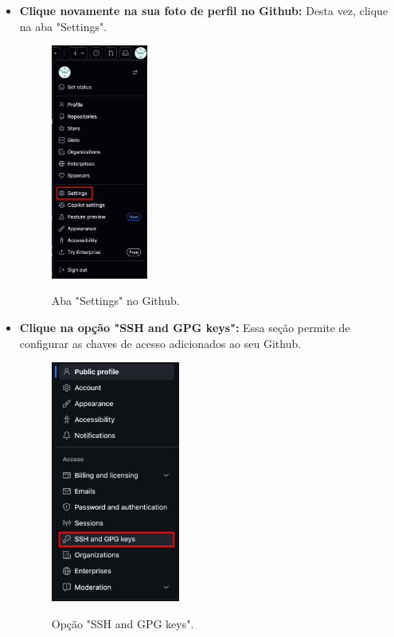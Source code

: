\begin{itemize}
    \item \textbf{Clique novamente na sua foto de perfil no Github:}
    Desta vez, clique na aba "Settings".

\begin{figure}[H]
\centering
\includegraphics[width=0.3\textwidth]{imgs/tutorial_criar_conta_github/7_settings.png}
\label{fig:edit_info}
\caption{Aba "Settings" no Github.}
\end{figure}

\item \textbf{Clique na opção "SSH and GPG keys":}
Essa seção permite de configurar as chaves de acesso adicionados ao seu Github.

\begin{figure}[H]
\centering
\includegraphics[width=0.4\textwidth]{imgs/tutorial_criar_conta_github/8_ssh_keys.png}
\label{fig:ssh_keys}
\caption{Opção "SSH and GPG keys".}
\end{figure}


\end{itemize}
